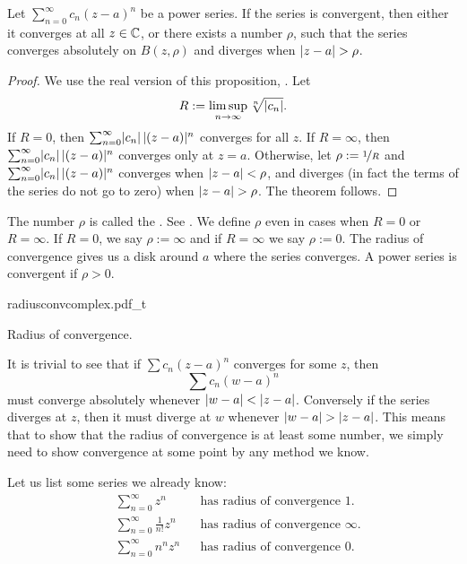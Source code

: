 \begin{prop}
Let $\sum_{n=0}^\infty c_n {(z-a)}^n$ be a power series.
If the series is convergent, then either it converges at
all $z \in {\mathbb{C}}$, or
there exists a number $\rho$, such that
the series converges absolutely on $B(z,\rho)$
and diverges when $\lvert {z-a} \rvert > \rho$.
\end{prop}

\begin{proof}
We use the real version of this proposition,
.
Let
\begin{equation*}
R := \limsup_{n\to\infty} \sqrt[n]{\lvert {c_n} \rvert} .
\end{equation*}
If $R = 0$, then
$\sum_{n=0}^\infty \lvert {c_n} \rvert \, \lvert {(z-a)} \rvert^n$ converges for all $z$.
If $R = \infty$, then
$\sum_{n=0}^\infty \lvert {c_n} \rvert \, \lvert {(z-a)} \rvert^n$ converges only at $z=a$.
Otherwise, let $\rho := \nicefrac{1}{R}$ and
$\sum_{n=0}^\infty \lvert {c_n} \rvert \, \lvert {(z-a)} \rvert^n$ converges when
$\lvert {z-a} \rvert < \rho$, and diverges (in fact the terms of the series
do not go to zero) when $\lvert {z-a} \rvert > \rho$.
The theorem follows.
\end{proof}

The number $\rho$ is called the \emph{}.
See .
We define $\rho$ even in cases when $R=0$ or $R= \infty$.  If $R=0$, we say
$\rho := \infty$ and if $R=\infty$ we say $\rho:=0$.
The radius of convergence gives us a disk around $a$ where the series converges.  A power series
is convergent if $\rho > 0$.
\begin{myfigureht}
{radiusconvcomplex.pdf_t}
\caption{Radius of convergence.\label{fig:radiusconvcomplex}}
\end{myfigureht}

It is trivial to see that if $\sum c_n {(z-a)}^n$ converges
for some $z$, then
\begin{equation*}
\sum c_n {(w-a)}^n
\end{equation*}
must converge absolutely whenever $\lvert {w-a} \rvert < \lvert {z-a} \rvert$.
Conversely if the series diverges at $z$, then it must diverge at $w$
whenever $\lvert {w-a} \rvert > \lvert {z-a} \rvert$.
This means that to show
that the radius of convergence is at least some number, we simply need to
show convergence at some point by any method we know.

\begin{example}
Let us list some series we already know:
\begin{align*}
& &
& \sum_{n=0}^\infty z^n
& & \text{has radius of convergence $1$.}
& &
\\
& &
& \sum_{n=0}^\infty \frac{1}{n!} z^n
& & \text{has radius of convergence $\infty$.}
& &
\\
& &
& \sum_{n=0}^\infty n^n z^n
& & \text{has radius of convergence $0$.}
& &
\end{align*}
\end{example}

